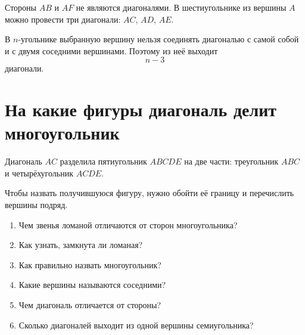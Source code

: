 Стороны \(AB\) и \(AF\) не являются диагоналями. В шестиугольнике из
вершины \(A\) можно провести три диагонали: \(AC\), \(AD\), \(AE\).

\begin{conclusionbox}
  В \(n\)-угольнике выбранную вершину нельзя соединять диагональю с самой
  собой и с двумя соседними вершинами. Поэтому из неё выходит
  \[
    n-3
  \]
  диагонали.
\end{conclusionbox}

\section{На какие фигуры диагональ делит многоугольник}

\pentagonsplitfigure

Диагональ \(AC\) разделила пятиугольник \(ABCDE\) на две части:
треугольник \(ABC\) и четырёхугольник \(ACDE\).

Чтобы назвать получившуюся фигуру, нужно обойти её границу и перечислить
вершины подряд.

\begin{questionsbox}
  \begin{enumerate}
    \item Чем звенья ломаной отличаются от сторон многоугольника?
    \item Как узнать, замкнута ли ломаная?
    \item Как правильно назвать многоугольник?
    \item Какие вершины называются соседними?
    \item Чем диагональ отличается от стороны?
    \item Сколько диагоналей выходит из одной вершины семиугольника?
  \end{enumerate}
\end{questionsbox}
